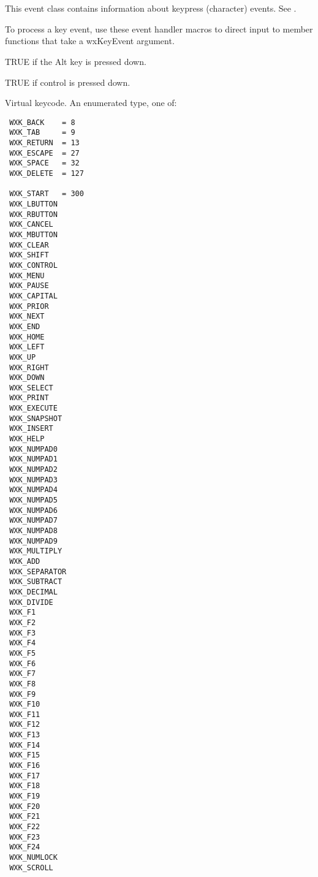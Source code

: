 \section{}\label{wxkeyevent}

This event class contains information about keypress (character) events. See .




To process a key event, use these event handler macros to direct input to member
functions that take a wxKeyEvent argument.

\twocolwidtha{7cm}
\begin{twocollist}\itemsep=0pt
\end{twocollist}%




TRUE if the Alt key is pressed down.



TRUE if control is pressed down.



Virtual keycode. An enumerated type, one of:

\begin{verbatim}
 WXK_BACK    = 8
 WXK_TAB     = 9
 WXK_RETURN  = 13
 WXK_ESCAPE  = 27
 WXK_SPACE   = 32
 WXK_DELETE  = 127

 WXK_START   = 300
 WXK_LBUTTON
 WXK_RBUTTON
 WXK_CANCEL
 WXK_MBUTTON
 WXK_CLEAR
 WXK_SHIFT
 WXK_CONTROL
 WXK_MENU
 WXK_PAUSE
 WXK_CAPITAL
 WXK_PRIOR
 WXK_NEXT
 WXK_END
 WXK_HOME
 WXK_LEFT
 WXK_UP
 WXK_RIGHT
 WXK_DOWN
 WXK_SELECT
 WXK_PRINT
 WXK_EXECUTE
 WXK_SNAPSHOT
 WXK_INSERT
 WXK_HELP
 WXK_NUMPAD0
 WXK_NUMPAD1
 WXK_NUMPAD2
 WXK_NUMPAD3
 WXK_NUMPAD4
 WXK_NUMPAD5
 WXK_NUMPAD6
 WXK_NUMPAD7
 WXK_NUMPAD8
 WXK_NUMPAD9
 WXK_MULTIPLY
 WXK_ADD
 WXK_SEPARATOR
 WXK_SUBTRACT
 WXK_DECIMAL
 WXK_DIVIDE
 WXK_F1
 WXK_F2
 WXK_F3
 WXK_F4
 WXK_F5
 WXK_F6
 WXK_F7
 WXK_F8
 WXK_F9
 WXK_F10
 WXK_F11
 WXK_F12
 WXK_F13
 WXK_F14
 WXK_F15
 WXK_F16
 WXK_F17
 WXK_F18
 WXK_F19
 WXK_F20
 WXK_F21
 WXK_F22
 WXK_F23
 WXK_F24
 WXK_NUMLOCK
 WXK_SCROLL 
\end{verbatim}

